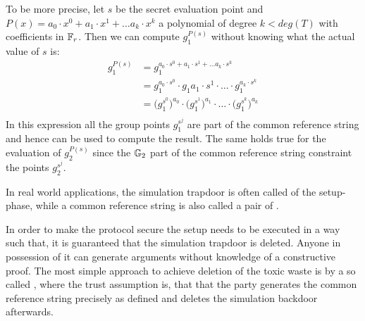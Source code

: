 To be more precise, let $s$ be the secret evaluation point and $P(x)=a_0\cdot x^0 + a_1\cdot x^1 + \ldots a_k\cdot x^k$ a polynomial of degree $k<deg(T)$ with coefficients in $\mathbb{F}_r$. Then we can compute $g_1^{P(s)}$ without knowing what the actual value of $s$ is:
\begin{align*}
g_1^{P(s)} & = g_1^{a_0\cdot s^0 + a_1\cdot s^1 + \ldots a_k\cdot s^k} \\
 & = g_1^{a_0\cdot s^0} \cdot g_1{a_1\cdot s^1} \cdot \ldots \cdot g_1^{a_k\cdot s^k}\\
 & = \Big(g_1^{s^0}\Big)^{a_0} \cdot \Big(g_1^{s^1}\Big)^{a_1} \cdot \ldots \cdot \Big(g_1^{s^k}\Big)^{a_k}\\
\end{align*}
In this expression all the group points $g_1^{s^j}$ are part of the common reference string and hence can be used to compute the result. The same holds true for the evaluation of $g_2^{P(s)}$ since the $\mathbb{G}_2$ part of the common reference string constraint the points $g_2^{s^j}$. 

In real world applications, the simulation trapdoor is often called  of the setup-phase, while a common reference string is also called a pair of . 

In order to make the protocol secure the setup needs to be executed in a way such that,  it is guaranteed that the simulation trapdoor is deleted. Anyone in possession of it can generate arguments without knowledge of a constructive proof. The most simple approach to achieve deletion of the toxic waste is by a so called , where the trust assumption is, that that the party generates the common reference string precisely as defined and deletes the simulation backdoor afterwards.

